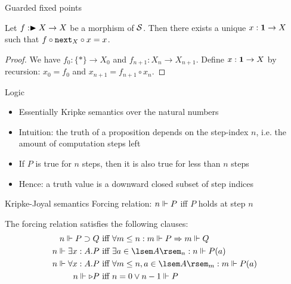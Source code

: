 \documentclass{beamer}
\begin{document}
\begin{frame}{Guarded fixed points}
\begin{prop}
Let $f : \blacktriangleright{X} \to X$ be a morphism of $\mathcal{S}$. Then there exists a unique
$x : \mathbf{1} \to X$ such that $f \circ \mathtt{next}_X \circ x = x$.
\end{prop}
\begin{proof}
We have $f_0 : \{*\} \to X_0$ and $f_{n+1} : X_n \to X_{n+1}$.
Define $x : \mathbf{1} \to X$ by recursion: $x_0 = f_0$ and $x_{n+1} = f_{n+1} \circ x_n$.
\end{proof}
\end{frame}

\begin{frame}{Logic}
\begin{itemize}
    \item Essentially Kripke semantics over the natural numbers
    \item Intuition: the truth of a proposition depends on the step-index $n$, i.e. the amount of computation steps left
    \item If $P$ is true for $n$ steps, then it is also true for less than $n$ steps
    \item Hence: a truth value is a downward closed subset of step indices
\end{itemize}
\end{frame}

\begin{frame}{Kripke-Joyal semantics}
Forcing relation: $n \Vdash P$ iff $P$ holds at step $n$
\begin{prop} \label{prop:kripke-joyal}
    The forcing relation satisfies the following clauses:
    \begin{align*}
        \force{n}{P \impl Q} &\iff
          \forall m \le n: \force{m}{P} \To \force{m}{Q} \\
        \force{n}{\exi{x}{A}{P}} &\iff
          \exists a \in \sem{A}_n: \force{n}{P(a)} \\
        \force{n}{\all{x}{A}{P}} &\iff
          \forall m \le n, a \in \sem{A}_m: \force{m}{P(a)} \\
        \force{n}{\later{P}} &\iff
          n = 0 \vee \force{n-1}{P}
    \end{align*}
\end{prop}
\end{frame}
\end{document}

